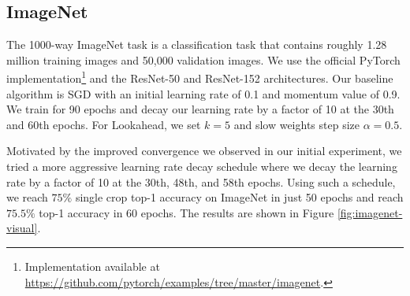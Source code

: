 \subsection{ImageNet} 

The 1000-way ImageNet task \citep{deng2009imagenet} is a classification task that contains roughly 1.28 million training images and 50,000 validation images. We use the official PyTorch implementation\footnote{Implementation available at \url{https://github.com/pytorch/examples/tree/master/imagenet}.} and the ResNet-50 and ResNet-152  \citep{he2016deep} architectures. Our baseline algorithm is SGD with an initial learning rate of 0.1 and momentum value of 0.9. We train for 90 epochs and decay our learning rate by a factor of 10 at the 30th and 60th epochs. For Lookahead, we set $k=5$ and slow weights step size $\alpha = 0.5$.

Motivated by the improved convergence we observed in our initial experiment, we tried a more aggressive learning rate decay schedule where we decay the learning rate by a factor of 10 at the 30th, 48th, and 58th epochs. Using such a schedule, we reach $75\%$ single crop top-1 accuracy on ImageNet in just 50 epochs and reach $75.5\%$ top-1 accuracy in 60 epochs. The results are shown in Figure \ref{fig:imagenet-visual}.


